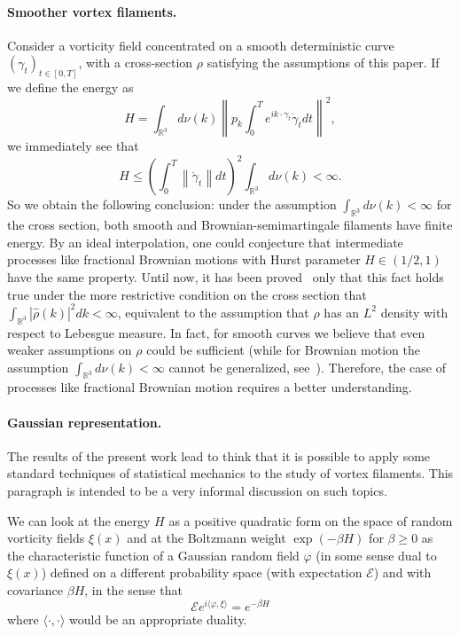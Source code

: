 \paragraph{Smoother vortex filaments.} 
Consider a vorticity field concentrated on a smooth deterministic
curve $(\gamma _{t})_{t\in \left[ 0,T\right] }$, with a cross-section $\rho $
satisfying the assumptions of this paper. If we define the energy as 
\begin{equation*}
H=\int_{\mathbb{R}^{3}}d\nu \left( k\right) \left\|
p_{k}\int_{0}^{T}e^{ik\cdot \gamma _{t}}\dot{\gamma}_{t}dt\right\| ^{2},
\end{equation*}
we immediately see that
\begin{equation*}
H\leq \left( \int_{0}^{T}\left\| \dot{\gamma}_{t}\right\| dt\right)
^{2}\int_{\mathbb{R}^{3}}d\nu \left( k\right) <\infty .
\end{equation*}
So we obtain the following conclusion: under the assumption $\int_{\mathbb{R}%
^{3}}d\nu \left( k\right) <\infty $ for the cross section, both smooth and
Brownian-semimartingale filaments have finite energy. By an ideal
interpolation, one could conjecture that intermediate processes like
fractional Brownian motions with Hurst parameter $H\in \left( 1/2%
,1\right) $ have the same property. Until now, it has been proved~\cite{Ida}
only that this fact holds true under the more restrictive condition on the
cross section that $\int_{\mathbb{R}^{3}}\left| \hat{\rho}\left( k\right)
\right| ^{2}dk<\infty $, equivalent to the assumption that $\rho $ has an $%
L^{2}$ density with respect to Lebesgue measure. In fact, for smooth curves
we believe that even weaker assumptions on $\rho $ could be sufficient
(while for Brownian motion the assumption $\int_{\mathbb{R}^{3}}d\nu \left(
k\right) <\infty $ cannot be generalized, see~\cite{Fl2}). Therefore, the
case of processes like fractional Brownian motion requires a better
understanding.


\paragraph{Gaussian representation.}
The results of the present work lead to think that it is possible to
apply some standard techniques of statistical mechanics to the study of
vortex filaments. This paragraph is intended to be a very informal
discussion on such topics.

We can look at the energy $H$ as a positive quadratic form  on the
space of random vorticity fields $\xi(x)$
and at the Boltzmann weight
$\exp (-\beta H)$ for $\beta \ge 0$ as the characteristic function of
a Gaussian random field $\varphi$ (in some sense dual to $\xi(x)$)
defined on a different probability space (with expectation
$\mathcal{E}$) and with covariance $\beta H$, in the sense that
$$
\mathcal{E}e^{i \langle \varphi, \xi \rangle }  = e^{-\beta H }   
$$    
where $\langle \cdot, \cdot \rangle$ would be an appropriate duality. 


